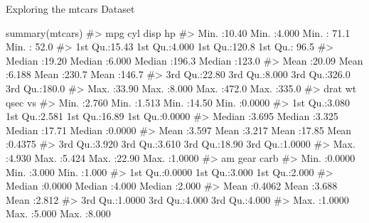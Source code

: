 \documentclass[
  18 pt,
  ignorenonframetext,
  aspectratio=1610,
]{beamer}
\newenvironment{Shaded}{\begin{snugshade}}{\end{snugshade}}
\newcommand{\CommentTok}[1]{\textcolor[rgb]{0.37,0.37,0.37}{#1}}
\newcommand{\FunctionTok}[1]{\textcolor[rgb]{0.28,0.35,0.67}{#1}}
\newcommand{\NormalTok}[1]{\textcolor[rgb]{0.00,0.23,0.31}{#1}}
\begin{document}
\begin{frame}[fragile]{Exploring the mtcars Dataset}
\begin{Shaded}
\begin{Highlighting}[]
\FunctionTok{summary}\NormalTok{(mtcars)}
\CommentTok{\#\textgreater{}       mpg             cyl             disp             hp       }
\CommentTok{\#\textgreater{}  Min.   :10.40   Min.   :4.000   Min.   : 71.1   Min.   : 52.0  }
\CommentTok{\#\textgreater{}  1st Qu.:15.43   1st Qu.:4.000   1st Qu.:120.8   1st Qu.: 96.5  }
\CommentTok{\#\textgreater{}  Median :19.20   Median :6.000   Median :196.3   Median :123.0  }
\CommentTok{\#\textgreater{}  Mean   :20.09   Mean   :6.188   Mean   :230.7   Mean   :146.7  }
\CommentTok{\#\textgreater{}  3rd Qu.:22.80   3rd Qu.:8.000   3rd Qu.:326.0   3rd Qu.:180.0  }
\CommentTok{\#\textgreater{}  Max.   :33.90   Max.   :8.000   Max.   :472.0   Max.   :335.0  }
\CommentTok{\#\textgreater{}       drat             wt             qsec             vs        }
\CommentTok{\#\textgreater{}  Min.   :2.760   Min.   :1.513   Min.   :14.50   Min.   :0.0000  }
\CommentTok{\#\textgreater{}  1st Qu.:3.080   1st Qu.:2.581   1st Qu.:16.89   1st Qu.:0.0000  }
\CommentTok{\#\textgreater{}  Median :3.695   Median :3.325   Median :17.71   Median :0.0000  }
\CommentTok{\#\textgreater{}  Mean   :3.597   Mean   :3.217   Mean   :17.85   Mean   :0.4375  }
\CommentTok{\#\textgreater{}  3rd Qu.:3.920   3rd Qu.:3.610   3rd Qu.:18.90   3rd Qu.:1.0000  }
\CommentTok{\#\textgreater{}  Max.   :4.930   Max.   :5.424   Max.   :22.90   Max.   :1.0000  }
\CommentTok{\#\textgreater{}        am              gear            carb      }
\CommentTok{\#\textgreater{}  Min.   :0.0000   Min.   :3.000   Min.   :1.000  }
\CommentTok{\#\textgreater{}  1st Qu.:0.0000   1st Qu.:3.000   1st Qu.:2.000  }
\CommentTok{\#\textgreater{}  Median :0.0000   Median :4.000   Median :2.000  }
\CommentTok{\#\textgreater{}  Mean   :0.4062   Mean   :3.688   Mean   :2.812  }
\CommentTok{\#\textgreater{}  3rd Qu.:1.0000   3rd Qu.:4.000   3rd Qu.:4.000  }
\CommentTok{\#\textgreater{}  Max.   :1.0000   Max.   :5.000   Max.   :8.000}
\end{Highlighting}
\end{Shaded}
\end{frame}
\end{document}
